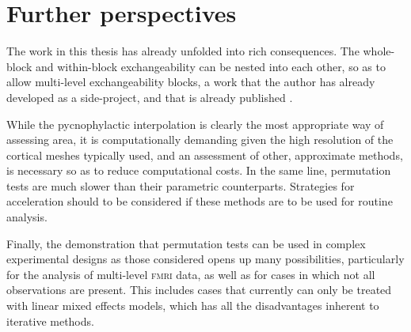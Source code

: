 \section{Further perspectives}

The work in this thesis has already unfolded into rich consequences. The whole-block and within-block exchangeability can be nested into each other, so as to allow multi-level exchangeability blocks, a work that the author has already developed as a side-project, and that is already published \citep{Winkler2015}.

While the pycnophylactic interpolation is clearly the most appropriate way of assessing area, it is computationally demanding given the high resolution of the cortical meshes typically used, and an assessment of other, approximate methods, is necessary so as to reduce computational costs. In the same line, permutation tests are much slower than their parametric counterparts. Strategies for acceleration should to be considered if these methods are to be used for routine analysis.

Finally, the demonstration that permutation tests can be used in complex experimental designs as those considered opens up many possibilities, particularly for the analysis of multi-level \textsc{fmri} data, as well as for cases in which not all observations are present. This includes cases that currently can only be treated with linear mixed effects models, which has all the disadvantages inherent to iterative methods.